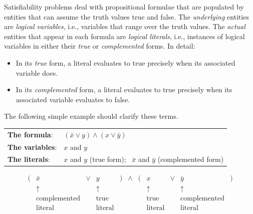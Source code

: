 Satisfiability problems deal with propositional formulae that are
populated by entities that can assume the truth values {\small\sf
  true} and {\small\sf false}. 
The {\em underlying} entities are {\it logical variables},
i.e., variables that range over the truth values.  The {\em actual}
entities that appear in each formula are {\it logical literals}, 
i.e., instances of logical variables in either their {\em true} or
{\em complemented} forms.
In detail:
\begin{itemize}
\item
In its {\em true} form, a literal evaluates to {\small\sf true}
precisely when its associated variable does.
\item
In its {\em complemented} form, a literal evaluates to {\small\sf
  true} precisely when its associated variable evaluates to {\small\sf
  false}.
\end{itemize}
The following simple example should clarify these terms.

\begin{tabular}{ll}
{\bf The formula}:  & $(\bar{x} \vee y) \wedge (x \vee \bar{y})$ \\
{\bf The variables}: & $x$ and $y$ \\
{\bf The literals}:  & $x$ and $y$ (true form); \ $\bar{x}$ and $\bar{y}$
(complemented form)
\end{tabular}
\[
\begin{array}{ccccccccccc}
( & \bar{x} & \vee & y & ) & \wedge & ( & x & \vee & \bar{y} & ) \\
  & \uparrow &     & \uparrow & & & & \uparrow & & \uparrow & \\
  & \mbox{complemented} &  & \mbox{true}  & & & & \mbox{true} &
        & \mbox{complemented} &  \\
  & \mbox{literal} & & \mbox{literal} & & & & \mbox{literal} & &
  \mbox{literal} & 
\end{array}
\]


